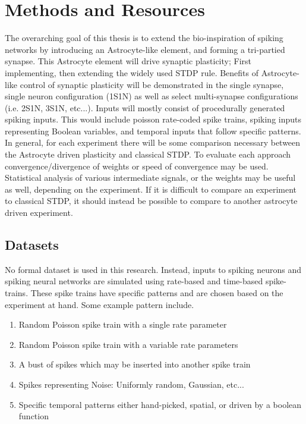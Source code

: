 %
%


\chapter{Methods and Resources} \label{section:methods}
    The overarching goal of this thesis is to extend the bio-inspiration of
    spiking networks by introducing an Astrocyte-like element, and forming a
    tri-partied synapse. This Astrocyte element will drive synaptic plasticity;
    First implementing, then extending the widely used STDP rule. Benefits of
    Astrocyte-like control of synaptic plasticity will be demonstrated in the
    single synapse, single neuron configuration (1S1N) as well as select
    multi-synapse configurations (i.e. 2S1N, 3S1N, etc...). Inputs will mostly
    consist of procedurally generated spiking inputs. This would include poisson
    rate-coded spike trains, spiking inputs representing Boolean variables, and
    temporal inputs that follow specific patterns. In general, for each
    experiment there will be some comparison necessary between the Astrocyte
    driven plasticity and classical STDP. To evaluate each approach
    convergence/divergence of weights or speed of convergence may be
    used. Statistical analysis of various intermediate signals, or the weights
    may be useful as well, depending on the experiment. If it is difficult to
    compare an experiment to classical STDP, it should instead be possible to
    compare to another astrocyte driven experiment.

    \section{Datasets} \label{section:datasets}
    No formal dataset is used in this research. Instead, inputs to spiking
    neurons and spiking neural networks are simulated using rate-based and
    time-based spike-trains. These spike trains have specific patterns and are
    chosen based on the experiment at hand. Some example pattern include.
    \begin{enumerate}
    \item Random Poisson spike train with a single rate parameter
    \item Random Poisson spike train with a variable rate parameters
    \item A bust of spikes which may be inserted into another spike train
    \item Spikes representing Noise: Uniformly random, Gaussian, etc...
    \item Specific temporal patterns either hand-picked, spatial, or driven by a
      boolean function
    \end{enumerate}
        
